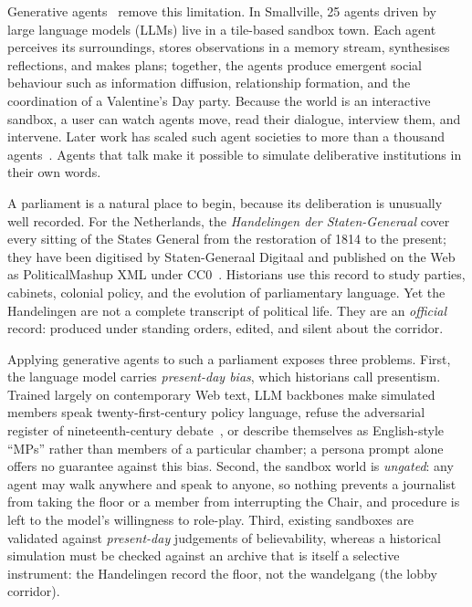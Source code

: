 \documentclass[sigconf,review,anonymous]{acmart}
\begin{document}
Generative agents~\cite{park2023generative} remove this limitation. In
Smallville, 25 agents driven by large language models (LLMs) live in a
tile-based sandbox town. Each agent perceives its surroundings, stores
observations in a memory stream, synthesises reflections, and makes plans;
together, the agents produce emergent social behaviour such as information
diffusion, relationship formation, and the coordination of a Valentine's
Day party. Because the world is an interactive sandbox, a user can watch
agents move, read their dialogue, interview them, and intervene. Later
work has scaled such agent societies to more than a thousand
agents~\cite{al2024projectsid,piao2025agentsociety}. Agents that talk make
it possible to simulate deliberative institutions in their own words.

A parliament is a natural place to begin, because its deliberation is
unusually well recorded. For the Netherlands, the \emph{Handelingen der
Staten-Generaal} cover every sitting of the States General from the
restoration of 1814 to the present; they have been digitised by
Staten-Generaal Digitaal and published on the Web as PoliticalMashup XML
under CC0~\cite{marx2012dutchparl,marx2010dutchparl}. Historians use this
record to study parties, cabinets, colonial policy, and the evolution of
parliamentary language. Yet the Handelingen are not a complete transcript
of political life. They are an \emph{official} record: produced under
standing orders, edited, and silent about the corridor.

Applying generative agents to such a parliament exposes three problems.
First, the language model carries \emph{present-day bias}, which
historians call presentism. Trained largely on contemporary Web text, LLM
backbones make simulated members speak twenty-first-century policy
language, refuse the adversarial register of nineteenth-century
debate~\cite{wang2025identity,bender2021parrots}, or describe themselves
as English-style ``MPs'' rather than members of a particular chamber; a
persona prompt alone offers no guarantee against this bias. Second, the
sandbox world is \emph{ungated}: any agent may walk anywhere and speak to
anyone, so nothing prevents a journalist from taking the floor or a member
from interrupting the Chair, and procedure is left to the model's
willingness to role-play. Third, existing sandboxes are validated against
\emph{present-day} judgements of believability, whereas a historical
simulation must be checked against an archive that is itself a selective
instrument: the Handelingen record the floor, not the wandelgang (the
lobby corridor).
\end{document}
